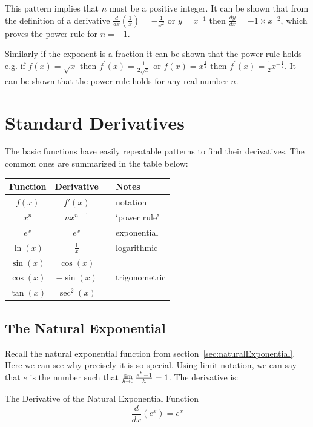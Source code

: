 This pattern implies that $n$ must be a positive integer. It can be shown that from the definition of a derivative $\frac{d}{d x} \genfrac{(}{)}{}{}{1}{x} = -\frac{1}{x^{2}}$ or $y =x^{ -1}$ then $\frac{d y}{d x} = -1 \times x^{ -2}$, which proves the power rule for $n = -1$. 

Similarly if the exponent is a fraction it can be shown that the power rule holds e.g. if $f (x) =\sqrt{x}$ then $f^{ \prime } (x) =\frac{1}{2 \sqrt{x}}$ or $f (x) =x^{\frac{1}{2}}$ then $f^{ \prime } (x) =\frac{1}{2} x^{ -\frac{1}{2}}$. It can be shown that the power rule holds for any real number $n$. 

\section{Standard Derivatives}
The basic functions have easily repeatable patterns to find their derivatives. The common ones are summarized in the table below:
\begin{center}
\begin{tabular}{ccll}	
	\toprule
	Function& Derivative&&Notes\\\midrule
	$f(x)$ & $f'(x)$  &&notation\\ \midrule
	$x^n$ & $nx^{n-1}$ &&`power rule'\\ \midrule
	$e^x$ & $e^x$  && exponential\\ \midrule
	$\ln(x)$ & $\frac{1}{x}$ &&logarithmic\\ \midrule
	$\sin(x)$ & $\cos(x)$  && \\ \cmidrule{1-2}
	$\cos(x)$ & $-\sin(x)$ && trigonometric\\ \cmidrule{1-2}
	$\tan(x)$ & $\sec^2(x)$ && \\ \bottomrule
\end{tabular}
\end{center}


\subsection*{The Natural Exponential}
Recall the natural exponential function from section~\ref{sec:naturalExponential}. Here we can see why precisely it is so special. Using limit notation, we can say that $e$ is the number such that $\Lim{h\to 0}\frac{e^{h} -1}{h} =1$. The derivative is:

\begin{tcolorbox}
The Derivative of the Natural Exponential Function
$$\frac{d}{d x} \left (e^{x}\right ) =e^{x}$$
\end{tcolorbox}

